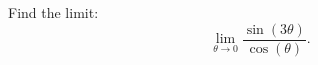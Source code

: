 \documentclass{ximera}
\author{Emma Smith Zbarsky}
\begin{document}
\begin{exercise}

Find the limit:
\[\lim_{\theta \to 0} \frac{\sin(3\theta)}{\cos(\theta)}.\]


\begin{multipleChoice}
\choice{$\infty$}
\choice{$-\infty$}
\end{multipleChoice}

\end{exercise}
\end{document}
